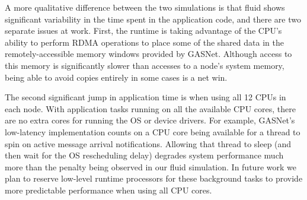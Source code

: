 A more qualitative difference between the two simulations is that fluid shows
significant variability in the time spent in the application code, and there
are two separate issues at work.  First, the runtime is taking advantage of
the CPU's ability to perform RDMA operations to place some of the shared data
in the remotely-accessible memory windows provided by GASNet.  Although access
to this memory is significantly slower than accesses to a node's system memory,
being able to avoid copies entirely in some cases is a net win.

The second significant jump in application time is when using all 12 CPUs in
each node.  With application tasks running on all the available CPU cores,
there are no extra cores for running the OS or device drivers.
For example, GASNet's low-latency implementation counts on a CPU core being
available for 
a thread to spin on active message arrival notifications.  Allowing that thread to
sleep (and then wait for the OS rescheduling delay) degrades system performance
much more than the penalty being observed in our fluid simulation.  In future
work we plan to reserve low-level runtime processors for these background
tasks to provide more predictable performance when using all CPU cores.


